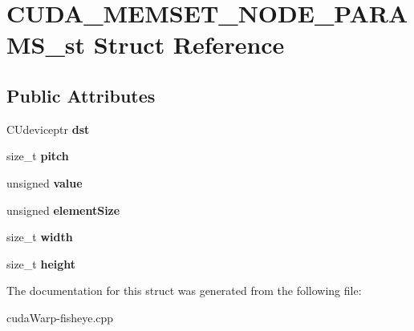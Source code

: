 \hypertarget{structCUDA__MEMSET__NODE__PARAMS__st}{}\section{C\+U\+D\+A\+\_\+\+M\+E\+M\+S\+E\+T\+\_\+\+N\+O\+D\+E\+\_\+\+P\+A\+R\+A\+M\+S\+\_\+st Struct Reference}
\label{structCUDA__MEMSET__NODE__PARAMS__st}
\subsection*{Public Attributes}
\begin{DoxyCompactItemize}
\item 
C\+Udeviceptr {\bfseries dst}\hypertarget{structCUDA__MEMSET__NODE__PARAMS__st_a8171e35136b98e482b525da61c9e7559}{}\label{structCUDA__MEMSET__NODE__PARAMS__st_a8171e35136b98e482b525da61c9e7559}

\item 
size\+\_\+t {\bfseries pitch}\hypertarget{structCUDA__MEMSET__NODE__PARAMS__st_a9816540d1758a3a018d640ffcbf9b750}{}\label{structCUDA__MEMSET__NODE__PARAMS__st_a9816540d1758a3a018d640ffcbf9b750}

\item 
unsigned {\bfseries value}\hypertarget{structCUDA__MEMSET__NODE__PARAMS__st_aae1b5af773ca95443144140e1722ec27}{}\label{structCUDA__MEMSET__NODE__PARAMS__st_aae1b5af773ca95443144140e1722ec27}

\item 
unsigned {\bfseries element\+Size}\hypertarget{structCUDA__MEMSET__NODE__PARAMS__st_a6d1275955ee8bc78f7becdef69f870f5}{}\label{structCUDA__MEMSET__NODE__PARAMS__st_a6d1275955ee8bc78f7becdef69f870f5}

\item 
size\+\_\+t {\bfseries width}\hypertarget{structCUDA__MEMSET__NODE__PARAMS__st_ae90c2cbb34c7c4da48cdb54fe77e885f}{}\label{structCUDA__MEMSET__NODE__PARAMS__st_ae90c2cbb34c7c4da48cdb54fe77e885f}

\item 
size\+\_\+t {\bfseries height}\hypertarget{structCUDA__MEMSET__NODE__PARAMS__st_a583f1268b6499a9db71c37218c3d19bf}{}\label{structCUDA__MEMSET__NODE__PARAMS__st_a583f1268b6499a9db71c37218c3d19bf}

\end{DoxyCompactItemize}


The documentation for this struct was generated from the following file\+:\begin{DoxyCompactItemize}
\item 
cuda\+Warp-\/fisheye.\+cpp\end{DoxyCompactItemize}

